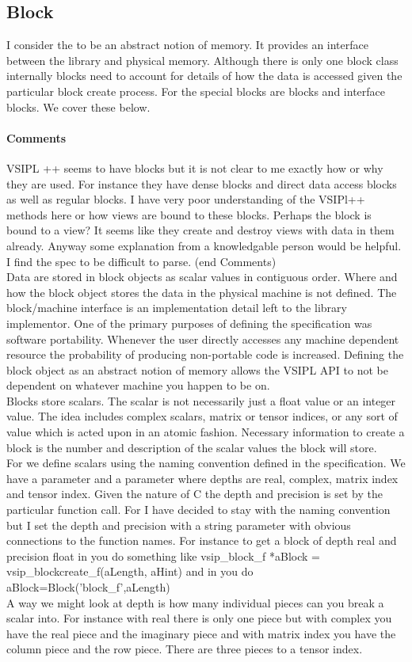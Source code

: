 \subsection{Block}
I consider the \blk{} to be an abstract notion of memory. It provides an interface between the library and  physical memory.  Although there is only one block class internally blocks need to account for details of how the data is accessed given the particular block create process. For \cvl{} the special blocks are  blocks and interface blocks.  We cover these below. 
\paragraph{Comments} VSIPL ++ seems to have blocks but it is not clear to me exactly how or why they are used.  For instance they have dense blocks and direct data access blocks as well as regular blocks.  I have very poor understanding of the VSIPl++ methods here or how views are bound to these blocks.  Perhaps the block is bound to a view?  It seems like they create and destroy views with data in them already. Anyway some explanation from a knowledgable person would be helpful. I find the spec to be difficult to parse.   (end Comments)
\\[6pt]
Data are stored in block objects as scalar values in contiguous order. Where and how the block object stores the data in the physical machine is not defined. The block/machine interface is an implementation detail left to the library implementor.  One of the primary purposes of defining the \cvl{} specification was software portability. Whenever the user directly accesses any machine dependent resource the probability of producing non-portable code is increased. Defining the block object as an abstract notion of memory allows the VSIPL API to not be dependent on whatever machine you happen to be on.  
\\[6pt]
Blocks store scalars.  The scalar is not necessarily just a float value or an integer value.  The idea includes complex scalars, matrix or tensor indices, or any sort of value which is acted upon in an atomic fashion. Necessary information to create a block is the number and description of the scalar values the block will store.
\\[6pt]
For \cvl{} we define scalars using the naming convention defined in the specification. We have a   parameter and a  parameter where depths are real, complex, matrix index and tensor index. Given the nature of C the depth and precision is set by the particular function call. For \pyjv{} I have decided to stay with the naming convention but I set the depth and precision with a string parameter with obvious connections to the \cvl{} function names. For instance to get a block of depth real and precision float in \cvl{} you do something like
vsip\_block\_f *aBlock = vsip\_blockcreate\_f(aLength, aHint)
and in \pyjv{} you do
aBlock=Block('block\_f',aLength)
\\[6pt]
A way we might look at depth is how many individual pieces can you break a scalar into. For instance with real there is only one piece but with complex you have the real piece and the imaginary piece and with matrix index you have the column piece and the row piece. There are three pieces to a tensor index. 
